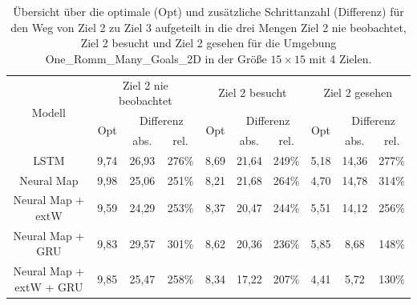 \begin{table}
  \begin{tabular}{|c|c|c|c|c|c|c|c|c|c|}
    \hline
    \multirow{3}{*}{Modell} & \multicolumn{3}{|c|}{Ziel 2 nie beobachtet} & \multicolumn{3}{|c|}{Ziel 2 besucht} & \multicolumn{3}{|c|}{Ziel 2 gesehen} \\ \cline{2-10}
    & \multirow{2}{*}{Opt} & \multicolumn{2}{|c|}{Differenz} & \multirow{2}{*}{Opt} & \multicolumn{2}{|c|}{Differenz} & \multirow{2}{*}{Opt} & \multicolumn{2}{|c|}{Differenz} \\ \cline{3-4} \cline{6-7} \cline{9-10}
    & & abs. & rel. & & abs. & rel. & & abs. & rel. \\ \hline
    LSTM & 9,74 & 26,93 & 276\% & 8,69 & 21,64 & 249\% & 5,18 & 14,36 & 277\% \\ \hline
    Neural Map & 9,98 & 25,06 & 251\% & 8,21 & 21,68 & 264\% & 4,70 & 14,78 & 314\% \\ \hline
    Neural Map + extW & 9,59 & 24,29 & 253\% & 8,37 & 20,47 & 244\% & 5,51 & 14,12 & 256\% \\ \hline
    Neural Map + GRU & 9,83 & 29,57 & 301\% & 8,62 & 20,36 & 236\% & 5,85 & 8,68 & 148\% \\ \hline
    Neural Map + extW + GRU & 9,85 & 25,47 & 258\% & 8,34 & 17,22 & 207\% & 4,41 & 5,72 & 130\% \\ \hline
  \end{tabular}
  \caption{Übersicht über die optimale (Opt) und zusätzliche Schrittanzahl (Differenz) für den Weg von Ziel 2 zu Ziel 3 aufgeteilt in die drei Mengen \glqq Ziel 2 nie beobachtet\grqq{}, \glqq Ziel 2 besucht\grqq{} und \glqq Ziel 2 gesehen\grqq{} für die Umgebung \glqq One\_Romm\_Many\_Goals\_2D\grqq{} in der Größe $15 \times 15$ mit 4 Zielen.}
  \label{results15x15_2_to_3_per_M}
\end{table}

